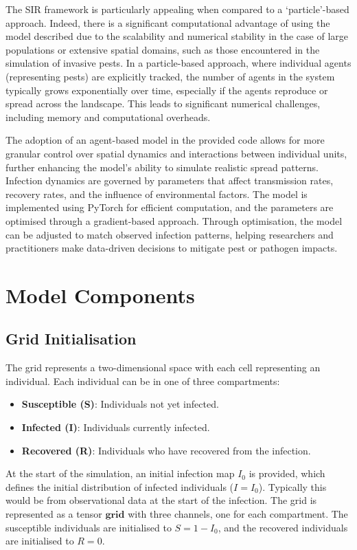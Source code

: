 \documentclass[12pt]{article}
\begin{document}
The SIR framework is particularly appealing when compared to a `particle'-based approach. Indeed, there is a significant computational advantage of using the model described due to the scalability and numerical stability in the case of large populations or extensive spatial domains, such as those encountered in the simulation of invasive pests. In a particle-based approach, where individual agents (representing pests) are explicitly tracked, the number of agents in the system typically grows exponentially over time, especially if the agents reproduce or spread across the landscape. This leads to significant numerical challenges, including memory and computational overheads.

The adoption of an agent-based model in the provided code allows for more granular control over spatial dynamics and interactions between individual units, further enhancing the model's ability to simulate realistic spread patterns. Infection dynamics are governed by parameters that affect transmission rates, recovery rates, and the influence of environmental factors. The model is implemented using PyTorch for efficient computation, and the parameters are optimised through a gradient-based approach. Through optimisation, the model can be adjusted to match observed infection patterns, helping researchers and practitioners make data-driven decisions to mitigate pest or pathogen impacts.

\section{Model Components}
\subsection{Grid Initialisation}
The grid represents a two-dimensional space with each cell representing an individual. Each individual can be in one of three compartments:
\begin{itemize}
    \item \textbf{Susceptible (S)}: Individuals not yet infected.
    \item \textbf{Infected (I)}: Individuals currently infected.
    \item \textbf{Recovered (R)}: Individuals who have recovered from the infection.
\end{itemize}
At the start of the simulation, an initial infection map $I_0$ is provided, which defines the initial distribution of infected individuals ($I=I_0$). Typically this would be from observational data at the start of the infection. The grid is represented as a tensor $\mathbf{grid}$ with three channels, one for each compartment. The susceptible individuals are initialised to $S = 1 - I_0$, and the recovered individuals are initialised to $R = 0$.
\end{document}
